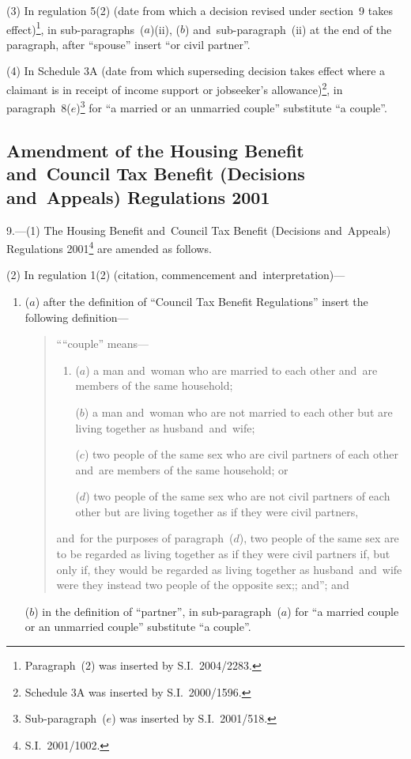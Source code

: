 \documentclass[12pt,a4paper]{article}
\begin{document}
(3) In regulation 5(2) (date from which a decision revised under section~9 takes effect)\footnote{Paragraph~(2) was inserted by S.I.~2004/2283.}, in sub-paragraphs~($a$)(ii), ($b$)  and~sub-paragraph~(ii) at the end of the paragraph, after “spouse” insert “or civil partner”.

(4) In Schedule 3A (date from which superseding decision takes effect where a claimant is in receipt of income support or jobseeker’s allowance)\footnote{Schedule 3A was inserted by S.I.~2000/1596.}, in paragraph~8($e$)\footnote{Sub-paragraph~($e$) was inserted by S.I.~2001/518.} for “a married or an unmarried couple” substitute “a couple”.

\subsection[9. Amendment of the Housing Benefit and~Council Tax Benefit (Decisions and~Appeals) Regulations 2001]{Amendment of the Housing Benefit and~Council Tax Benefit (Decisions and~Appeals) Regulations 2001}

9.---(1)  The Housing Benefit and~Council Tax Benefit (Decisions and~Appeals) Regulations 2001\footnote{S.I.~2001/1002.} are amended as follows.

(2) In regulation 1(2) (citation, commencement and~interpretation)—
\begin{enumerate}\item[]
($a$) after the definition of “Council Tax Benefit Regulations” insert the following definition—
\begin{quotation}
““couple” means—
\begin{enumerate}\item[]
($a$) 
a man and~woman who are married to each other and~are members of the same household;

($b$) 
a man and~woman who are not married to each other but are living together as husband~and~wife;

($c$) 
two people of the same sex who are civil partners of each other and~are members of the same household; or

($d$) 
two people of the same sex who are not civil partners of each other but are living together as if they were civil partners,
\end{enumerate}
and~for the purposes of paragraph~($d$), two people of the same sex are to be regarded as living together as if they were civil partners if, but only if, they would be regarded as living together as husband~and~wife were they instead two people of the opposite sex;; and”; and
\end{quotation}

($b$) in the definition of “partner”, in sub-paragraph~($a$)  for “a married couple or an unmarried couple” substitute “a couple”.
\end{enumerate}
\end{document}
